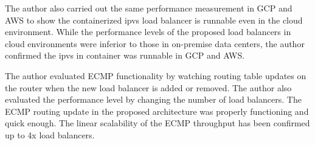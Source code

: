 The author also carried out the same performance measurement in GCP and AWS to show the containerized ipvs load balancer is runnable even in the cloud environment.
While the performance levels of the proposed load balancers in cloud environments were inferior to those in on-premise data centers, the author confirmed the ipvs in container was runnable in GCP and AWS.

The author evaluated ECMP functionality by watching routing table updates on the router when the new load balancer is added or removed.
The author also evaluated the performance level by changing the number of load balancers.
The ECMP routing update in the proposed architecture was properly functioning and quick enough.
The linear scalability of the ECMP throughput has been confirmed up to 4x load balancers.



